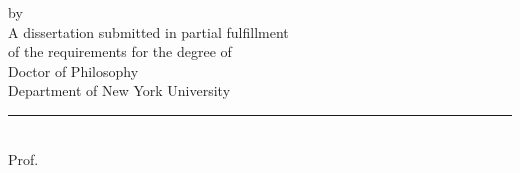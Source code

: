 \documentclass[12pt,letterpaper,oneside,final]{memoir}
\begin{document}
\fussy
{} %
\frontmatter
\hyphenation{}
\DoubleSpacing
\begin{center}
\thispagestyle{empty}


\vspace{20mm}
by\\
\vspace{10mm}
\vspace{10mm}
A dissertation submitted in partial fulfillment\\
of the requirements for the degree of\\
Doctor of Philosophy\\
Department of %
New York University\\
\end{center}
\vspace{35mm}
\begin{flushright}
{\rule[0pt]{45mm}{0.1mm}}\\

Prof. %

\end{flushright}

\newpage

\thispagestyle{empty}
\end{document}
